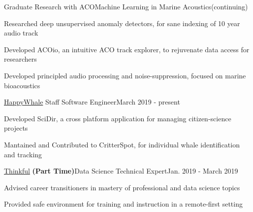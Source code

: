 \documentclass{article}
\newenvironment{**mylist}[2]{
  \subsubsection*{#1\hfill\small#2}
  \small
  \begin{list}{}{}
    \setlength{\topsep}{0pt}
   \setlength{\itemsep}{1pt}
   \setlength{\parskip}{0pt}
   \setlength{\parsep}{0pt}}{\end{list}\normalsize}
\newcommand{\LU}[1]{\hspace{-1em}{\bf Technologies : #1}}
\def\PT{{\bf(Part Time)}\xspace}
\begin{document}
\begin{**mylist}{Graduate Research with ACO\tabb Machine Learning in Marine Acoustics}{(continuing)}
\item Researched deep unsupervised anomaly detectors, for sane indexing of 10 year audio track
\item Developed ACOio, %
  an intuitive ACO track explorer, to rejuvenate data access for researchers
\item Developed principled audio processing and noise-suppression, focused on marine bioacoustics
\item \LU{Python, ACOio, tensorflow, scipy.signal, Jupyter}
\end{**mylist}

\begin{**mylist}{\href{www.happywhale.com}{HappyWhale} \tabb Staff Software Engineer}{March 2019 - present}
\item Developed SciDir, a cross platform application for managing citizen-science projects
\item Mantained and Contributed to CritterSpot, for individual whale identification and tracking
\item \LU{NativeScript, Angular, node.js, Android, PostgreSQL}
\end{**mylist}

\begin{**mylist}{\href{www.thinkful.com}{Thinkful} \PT \tabb Data Science Technical Expert}{Jan. 2019 - March 2019}
\item Advised career transitioners in mastery of professional and data science topics
\item Provided safe environment for training and instruction in a remote-first setting
\end{**mylist}
\end{document}
